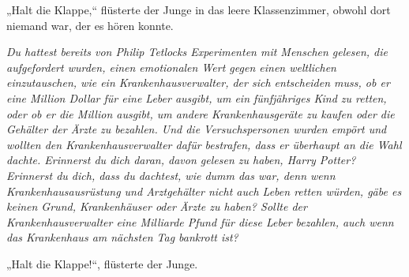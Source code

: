 „Halt die Klappe,“ flüsterte der Junge in das leere Klassenzimmer, obwohl dort niemand war, der es hören konnte.

\emph{Du hattest bereits von Philip Tetlocks Experimenten mit Menschen gelesen, die aufgefordert wurden, einen emotionalen Wert gegen einen weltlichen einzutauschen, wie ein Krankenhausverwalter, der sich entscheiden muss, ob er eine Million Dollar für eine Leber ausgibt, um ein fünfjähriges Kind zu retten, oder ob er die Million ausgibt, um andere Krankenhausgeräte zu kaufen oder die Gehälter der Ärzte zu bezahlen. Und die Versuchspersonen wurden empört und wollten den Krankenhausverwalter dafür bestrafen, dass er überhaupt an die Wahl dachte. Erinnerst du dich daran, davon gelesen zu haben, Harry Potter? Erinnerst du dich, dass du dachtest, wie dumm das war, denn wenn Krankenhausausrüstung und Arztgehälter nicht auch Leben retten würden, gäbe es keinen Grund, Krankenhäuser oder Ärzte zu haben? Sollte der Krankenhausverwalter eine Milliarde Pfund für diese Leber bezahlen, auch wenn das Krankenhaus am nächsten Tag bankrott ist?}

„Halt die Klappe!“, flüsterte der Junge.

